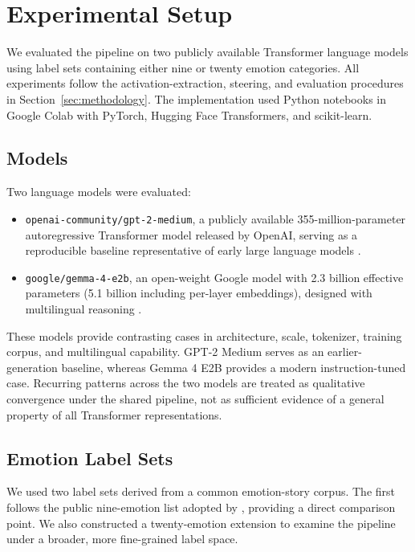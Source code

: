 \section{Experimental Setup}

We evaluated the pipeline on two publicly available Transformer language models using label sets containing either nine or twenty
emotion categories. All experiments follow the activation-extraction, steering, and evaluation procedures in
Section~\ref{sec:methodology}. The implementation used Python notebooks in Google Colab with PyTorch, Hugging Face Transformers,
and scikit-learn.

\subsection{Models}
Two language models were evaluated:

\begin{itemize}
    \item \texttt{openai-community/gpt-2-medium}, a publicly available 355-million-parameter autoregressive Transformer model released by OpenAI, serving as a reproducible baseline representative of early large language models \cite{radford_language_2019}.
    \item \texttt{google/gemma-4-e2b}, an open-weight Google model with 2.3 billion effective parameters (5.1 billion including per-layer embeddings), designed with multilingual reasoning \cite{team_gemma_2026}.
\end{itemize}

These models provide contrasting cases in architecture, scale, tokenizer, training corpus, and multilingual capability. 
GPT-2 Medium serves as an earlier-generation baseline, whereas Gemma 4 E2B provides a modern instruction-tuned case. 
Recurring patterns across the two models are treated as qualitative convergence under the shared pipeline, not as 
sufficient evidence of a general property of all Transformer representations.

\subsection{Emotion Label Sets}

We used two label sets derived from a common emotion-story corpus. The first follows the public nine-emotion list adopted by
\cite{hsieh_replicating_2026}, providing a direct comparison point. We also constructed a twenty-emotion extension to examine
the pipeline under a broader, more fine-grained label space.

